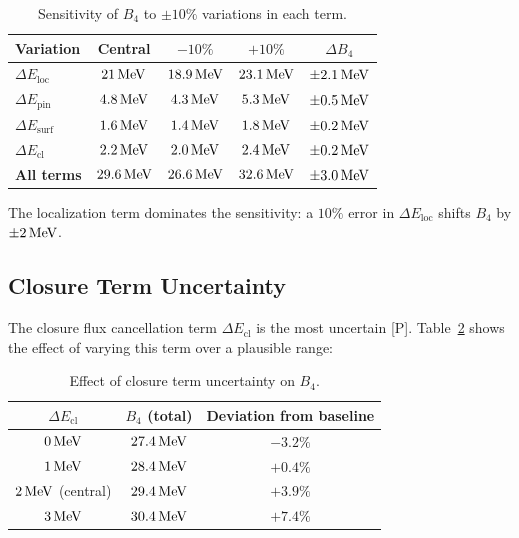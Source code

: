 \begin{table}[h]
\centering
\caption{Sensitivity of $B_4$ to $\pm 10\%$ variations in each term.}
\label{tab:he4:sensitivity}
\begin{tabular}{lcccc}
    \toprule
    Variation & Central & $-10\%$ & $+10\%$ & $\Delta B_4$ \\
    \midrule
    $\Delta E_{\text{loc}}$ & $21\,\mathrm{MeV}$ & $18.9\,\mathrm{MeV}$ & $23.1\,\mathrm{MeV}$ & $\pm 2.1\,\mathrm{MeV}$ \\
    $\Delta E_{\text{pin}}$ & $4.8\,\mathrm{MeV}$ & $4.3\,\mathrm{MeV}$ & $5.3\,\mathrm{MeV}$ & $\pm 0.5\,\mathrm{MeV}$ \\
    $\Delta E_{\text{surf}}$ & $1.6\,\mathrm{MeV}$ & $1.4\,\mathrm{MeV}$ & $1.8\,\mathrm{MeV}$ & $\pm 0.2\,\mathrm{MeV}$ \\
    $\Delta E_{\text{cl}}$ & $2.2\,\mathrm{MeV}$ & $2.0\,\mathrm{MeV}$ & $2.4\,\mathrm{MeV}$ & $\pm 0.2\,\mathrm{MeV}$ \\
    \midrule
    \textbf{All terms} & $29.6\,\mathrm{MeV}$ & $26.6\,\mathrm{MeV}$ & $32.6\,\mathrm{MeV}$ & $\pm 3.0\,\mathrm{MeV}$ \\
    \bottomrule
\end{tabular}
\end{table}

The localization term dominates the sensitivity: a $10\%$ error in
$\Delta E_{\text{loc}}$ shifts $B_4$ by $\pm 2\,\mathrm{MeV}$.

\subsection{Closure Term Uncertainty}

The closure flux cancellation term $\Delta E_{\text{cl}}$ is the most
uncertain [P]. Table~\ref{tab:closure_range} shows the effect of
varying this term over a plausible range:

\begin{table}[h]
\centering
\caption{Effect of closure term uncertainty on $B_4$.}
\label{tab:closure_range}
\begin{tabular}{ccc}
    \toprule
    $\Delta E_{\text{cl}}$ & $B_4$ (total) & Deviation from baseline \\
    \midrule
    $0\,\mathrm{MeV}$ & $27.4\,\mathrm{MeV}$ & $-3.2\%$ \\
    $1\,\mathrm{MeV}$ & $28.4\,\mathrm{MeV}$ & $+0.4\%$ \\
    $2\,\mathrm{MeV}$ (central) & $29.4\,\mathrm{MeV}$ & $+3.9\%$ \\
    $3\,\mathrm{MeV}$ & $30.4\,\mathrm{MeV}$ & $+7.4\%$ \\
    \bottomrule
\end{tabular}
\end{table}

